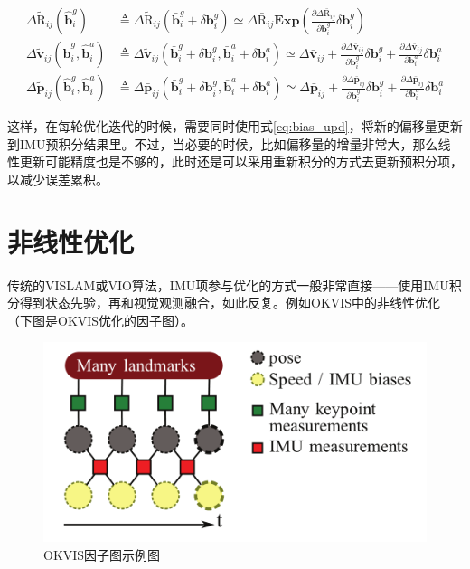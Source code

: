 \begin{equation}
\begin{aligned}
    \Delta\tilde{\mathrm R}_{ij}(\hat{\mathbf b}_i^g)
  &\triangleq \Delta\tilde{\mathrm R}_{ij}(\bar{\mathbf b}^g_i + \delta\mathbf{b}^g_i)
  \simeq \Delta\bar{\mathrm R}_{ij}
  \bm{Exp}\left(
      \tfrac{\partial\Delta\bar{\mathrm R}_{ij}}{\partial\mathbf{b}^g_i}
      \delta\mathbf{b}^g_i
  \right) \\
  \Delta\tilde{\mathbf v}_{ij}(\hat{\mathbf b}^g_i,\hat{\mathbf b}^a_i)
  &\triangleq \Delta\tilde{\mathbf v}_{ij}(
  \bar{\mathbf b}^g_i + \delta\mathbf{b}^g_i,
  \bar{\mathbf b}^a_i + \delta\mathbf{b}^a_i)
  \simeq \Delta\bar{\mathbf v}_{ij} +
  \tfrac{\partial\Delta\bar{\mathbf v}_{ij}}{\partial\mathbf{b}^g_i}
  \delta\mathbf{b}^g_i +
  \tfrac{\partial\Delta\bar{\mathbf v}_{ij}}{\partial\mathbf{b}^a_i}
  \delta\mathbf{b}^a_i \\
  \Delta\tilde{\mathbf p}_{ij}(\hat{\mathbf b}^g_i,\hat{\mathbf b}^a_i)
  &\triangleq \Delta\bar{\mathbf p}_{ij}(
  \bar{\mathbf b}^g_i + \delta\mathbf{b}^g_i,
  \bar{\mathbf b}^a_i + \delta\mathbf{b}^a_i)
  \simeq \Delta\bar{\mathbf p}_{ij} +
  \tfrac{\partial\Delta\bar{\mathbf p}_{ij}}{\partial\mathbf{b}^g_i}
  \delta\mathbf{b}^g_i +
  \tfrac{\partial\Delta\bar{\mathbf p}_{ij}}{\partial\mathbf{b}^a_i}
  \delta\mathbf{b}^a_i
\end{aligned}\label{eq:bias_upd}
\end{equation}

这样，在每轮优化迭代的时候，需要同时使用式\eqref{eq:bias_upd}，将新的偏移量更新到IMU预积分结果里。不过，当必要的时候，比如偏移量的增量非常大，那么线性更新可能精度也是不够的，此时还是可以采用重新积分的方式去更新预积分项，以减少误差累积。

\section{非线性优化}

传统的VISLAM或VIO算法，IMU项参与优化的方式一般非常直接——使用IMU积分得到状态先验，再和视觉观测融合，如此反复。例如OKVIS中的非线性优化（下图是OKVIS优化的因子图）。

\begin{figure}[htb!]
    \centering
    \includegraphics[width=.6\textwidth]{./figs/okvis.png}
    \caption{OKVIS因子图示例图\citep{leutenegger2015keyframe}}
    \label{fig:okvis}
\end{figure}

